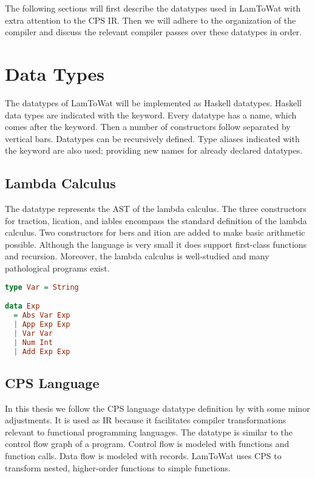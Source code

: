 The following sections will first describe the datatypes used in LamToWat with extra attention to the \ac{CPS} \ac{IR}. Then we will adhere to the organization of the compiler and discuss the relevant compiler passes over these datatypes in order.

\section{\label{section:datatypes}Data Types}
The datatypes of LamToWat will be implemented as Haskell datatypes. Haskell data types are indicated with the  keyword. Every datatype has a name, which comes after the keyword. Then a number of constructors follow separated by vertical bars. Datatypes can be recursively defined. Type aliases indicated with the  keyword are also used; providing new names for already declared datatypes.

\subsection{\label{subsection:expdata}Lambda Calculus}
The  datatype represents the \ac{AST} of the lambda calculus. The three constructors for traction, lication, and iables encompass the standard definition of the lambda calculus. Two constructors for bers and ition are added to make basic arithmetic possible. Although the language is very small it does support first-class functions and recursion. Moreover, the lambda calculus is well-studied \autocite{barendregt1984lambda} and many pathological programs exist.

\begin{lstlisting}[language=Haskell]
type Var = String

data Exp
  = Abs Var Exp
  | App Exp Exp
  | Var Var
  | Num Int
  | Add Exp Exp
\end{lstlisting}

\subsection{\label{subsection:cpsdata}CPS Language}
In this thesis we follow the \ac{CPS} language datatype definition by \citeauthor{DBLP:books/daglib/0022396} with some minor adjustments. It is used as \ac{IR} because it facilitates compiler transformations relevant to functional programming languages. The datatype is similar to the control flow graph of a program. Control flow is modeled with functions and function calls. Data flow is modeled with records. LamToWat uses \ac{CPS} to transform nested, higher-order functions to simple functions.

